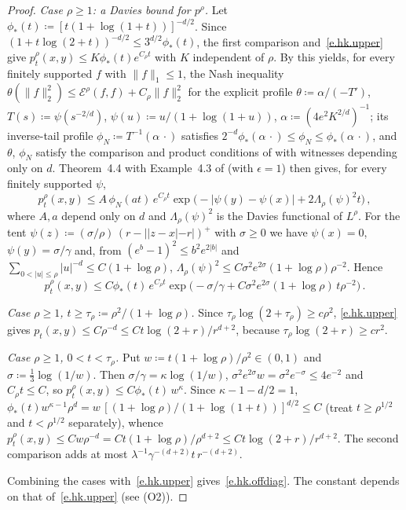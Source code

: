 \documentclass[11pt]{amsart}
\theoremstyle{plain}
\theoremstyle{definition}
\theoremstyle{remark}
\begin{document}
\begin{proof}
		\emph{Case $\rho \ge 1$: a Davies bound for $p^\rho$.} Let $\phi_*(t) \coloneqq [t(1+\log(1+t))]^{-d/2}$. Since
		$(1+t\log(2+t))^{-d/2} \le 3^{d/2}\phi_*(t)$, the first comparison and~\eqref{e.hk.upper} give $p^\rho_t(x,y) \le K\phi_*(t)e^{C_\rho t}$ with $K$
		independent of $\rho$. By \cite[Proposition~3.1(ii)]{ChenKimKumagaiWang2021} this yields, for every finitely supported $f$ with $\|f\|_1 \le 1$,
		the Nash inequality $\theta(\|f\|_2^2) \le \mathcal{E}^\rho(f,f) + C_\rho\|f\|_2^2$ for the explicit profile $\theta \coloneqq \alpha/(-T')$,
		$T(s) \coloneqq \psi(s^{-2/d})$, $\psi(u) \coloneqq u/(1+\log(1+u))$, $\alpha \coloneqq (4e^2K^{2/d})^{-1}$; its inverse-tail profile
		$\phi_N \coloneqq T^{-1}(\alpha\,\cdot)$ satisfies $2^{-d}\phi_*(\alpha\,\cdot) \le \phi_N \le \phi_*(\alpha\,\cdot)$, and $\theta$, $\phi_N$ satisfy the
		comparison and product conditions of \cite[Theorem~4.4]{ChenKimKumagaiWang2021} with witnesses depending only on $d$. Theorem~4.4 with
		Example~4.3 of \cite{ChenKimKumagaiWang2021} (with $\epsilon = 1$) then gives, for every finitely supported $\psi$,
		\[
		p^\rho_t(x,y) \le A\,\phi_N(at)\,e^{C_\rho t}\exp\bigl(-|\psi(y)-\psi(x)| + 2\Lambda_\rho(\psi)^2 t\bigr)\,,
		\]
		where $A,a$ depend only on $d$ and $\Lambda_\rho(\psi)^2$ is the Davies functional of $L^\rho$. For the tent
		$\psi(z) \coloneqq (\sigma/\rho)\,(r - ||z-x| - r|)^+$ with $\sigma \ge 0$ we have $\psi(x) = 0$, $\psi(y) = \sigma/\gamma$ and, from
		$(e^b-1)^2 \le b^2e^{2|b|}$ and $\sum_{0<|u|\le\rho}|u|^{-d} \le C(1+\log\rho)$, $\Lambda_\rho(\psi)^2 \le C\sigma^2e^{2\sigma}(1+\log\rho)\rho^{-2}$. Hence
		\[
		p^\rho_t(x,y) \le C\phi_*(t)\,e^{C_\rho t}\exp\bigl(-\sigma/\gamma + C\sigma^2e^{2\sigma}(1+\log\rho)\,t\rho^{-2}\bigr)\,.
		\]

		\emph{Case $\rho \ge 1$, $t \ge \tau_\rho \coloneqq \rho^2/(1+\log\rho)$.} Since $\tau_\rho\log(2+\tau_\rho) \ge c\rho^2$, \eqref{e.hk.upper} gives
		$p_t(x,y) \le C\rho^{-d} \le Ct\log(2+r)/r^{d+2}$, because $\tau_\rho\log(2+r) \ge cr^2$.

		\emph{Case $\rho \ge 1$, $0 < t < \tau_\rho$.} Put $w \coloneqq t(1+\log\rho)/\rho^2 \in (0,1)$ and $\sigma \coloneqq \tfrac13\log(1/w)$. Then
		$\sigma/\gamma = \kappa\log(1/w)$, $\sigma^2e^{2\sigma}w = \sigma^2e^{-\sigma} \le 4e^{-2}$ and $C_\rho t \le C$, so $p^\rho_t(x,y) \le C\phi_*(t)\,w^\kappa$.
		Since $\kappa - 1 - d/2 = 1$, $\phi_*(t)w^{\kappa-1}\rho^d = w\,[(1+\log\rho)/(1+\log(1+t))]^{d/2} \le C$ (treat $t \ge \rho^{1/2}$ and
		$t < \rho^{1/2}$ separately), whence $p^\rho_t(x,y) \le Cw\rho^{-d} = Ct(1+\log\rho)/\rho^{d+2} \le Ct\log(2+r)/r^{d+2}$. The second comparison
		adds at most $\lambda^{-1}\gamma^{-(d+2)}t\,r^{-(d+2)}$.

		Combining the cases with~\eqref{e.hk.upper} gives~\eqref{e.hk.offdiag}. The constant depends on that of~\eqref{e.hk.upper} (see (O2)).
	\end{proof}
	
\end{document}
